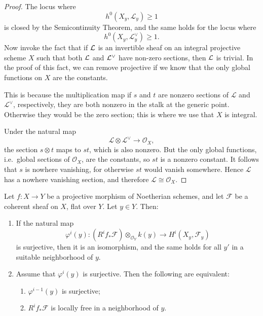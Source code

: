 \documentclass[12pt]{article}
\begin{document}
\begin{proof}
    The locus where
    \[
        h^0(X_y,\mathcal L_y)\ge 1
    \]
    is closed by the Semicontinuity Theorem, and the same holds for the locus where
    \[
        h^0(X_y,\mathcal L_y^{\vee})\ge 1.
    \]
    Now invoke the fact that if ${\mathcal{L}}$ is an invertible sheaf on an integral projective scheme $X$ such that
    both ${\mathcal{L}}$ and ${\mathcal{L}}^\vee$ have non-zero sections, then ${\mathcal{L}}$ is trivial. In the proof of this fact, we can remove projective if we know that the only global functions on $X$ are the constants.

    This is because the multiplication map if \(s\) and \(t\) are nonzero sections of \(\mathcal L\) and \(\mathcal L^{\vee}\), respectively, they are both nonzero in the stalk at the generic point. Otherwise they would be the zero section; this is where we use that \(X\) is integral.

    Under the natural map
    \[
        \mathcal L \otimes \mathcal L^{\vee} \longrightarrow \mathcal O_X,
    \]
    the section \(s \otimes t\) maps to \(st\), which is also nonzero.
    But the only global functions, i.e.\ global sections of \(\mathcal O_X\), are the constants, so \(st\) is a nonzero constant.
    It follows that \(s\) is nowhere vanishing, for otherwise \(st\) would vanish somewhere.
    Hence \(\mathcal L\) has a nowhere vanishing section, and therefore $\mathcal L \cong \mathcal O_X$.
\end{proof}



\begin{theorem}\label{thm:basechange}
    Let $f:X \to Y$ be a projective morphism of Noetherian schemes, and let
    $\mathcal F$ be a coherent sheaf on $X$, flat over $Y$. Let $y \in Y$. Then:

    \begin{enumerate}
        \item If the natural map
              \[
                  \varphi^i(y):
                  (R^i f_*\mathcal F)\otimes_{\mathcal O_Y} k(y)
                  \longrightarrow
                  H^i(X_y,\mathcal F_y)
              \]
              is surjective, then it is an isomorphism, and the same holds for all $y'$ in a suitable neighborhood of $y$.

        \item Assume that $\varphi^i(y)$ is surjective. Then the following are equivalent:
              \begin{enumerate}
                  \item $\varphi^{i-1}(y)$ is surjective;
                  \item $R^i f_*\mathcal F$ is locally free in a neighborhood of $y$.
              \end{enumerate}
    \end{enumerate}
\end{theorem}
\end{document}
